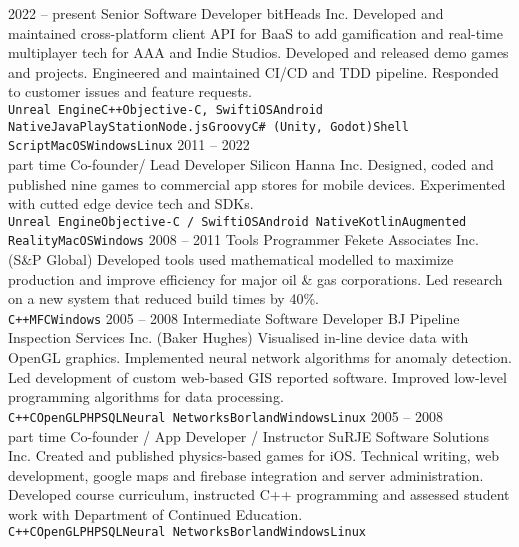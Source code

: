 \documentclass[9pt]{developercv} %
\begin{document}
\begin{entrylist}
	\entry
		{2022 -- present}
		{Senior Software Developer}
		{bitHeads Inc.}
		{Developed and maintained cross-platform client API for BaaS to add gamification and real-time multiplayer tech for AAA and Indie Studios. Developed and released demo games and projects. Engineered and maintained CI/CD and TDD pipeline. Responded to customer issues and feature requests.\\ \texttt{Unreal Engine}\slashsep\texttt{C++}\slashsep\texttt{Objective-C, Swift}\slashsep\texttt{iOS}\slashsep\texttt{Android Native}\slashsep\texttt{Java}\slashsep\texttt{PlayStation}\slashsep\texttt{Node.js}\slashsep\texttt{Groovy}\slashsep\texttt{C\# (Unity, Godot)}\slashsep\texttt{Shell Script}\slashsep\texttt{MacOS}\slashsep\texttt{Windows}\slashsep\texttt{Linux}}
\entry
		{2011 -- 2022\\\footnotesize{part time}}
		{Co-founder/ Lead Developer}
		{Silicon Hanna Inc.}
		{Designed, coded and published nine games to commercial app stores for mobile devices. Experimented with cutted edge device tech and SDKs.\\ \texttt{Unreal Engine}\slashsep\texttt{Objective-C / Swift}\slashsep\texttt{iOS}\slashsep\texttt{Android Native}\slashsep\texttt{Kotlin}\slashsep\texttt{Augmented Reality}\slashsep\texttt{MacOS}\slashsep\texttt{Windows}}
	\entry
		{2008 -- 2011}
		{Tools Programmer}
		{Fekete Associates Inc. (S\&P Global)}
		{Developed tools used mathematical modelled to maximize production and improve efficiency for major oil \& gas corporations. Led research on a new system that reduced build times by 40\%. \\ \texttt{C++}\slashsep\texttt{MFC}\slashsep\texttt{Windows}}
	\entry
		{2005 -- 2008}
		{Intermediate Software Developer}
		{BJ Pipeline Inspection Services Inc. (Baker Hughes)}
		{Visualised in-line device data with OpenGL graphics. Implemented neural network algorithms for anomaly detection. Led development of custom web-based GIS reported software. Improved low-level programming algorithms for data processing.\\ \texttt{C++}\slashsep\texttt{C}\slashsep\texttt{OpenGL}\slashsep\texttt{PHP}\slashsep\texttt{SQL}\slashsep\texttt{Neural Networks}\slashsep\texttt{Borland}\slashsep\texttt{Windows}\slashsep\texttt{Linux}}
	\entry
		{2005 -- 2008\\\footnotesize{part time}}
		{Co-founder / App Developer / Instructor}
		{SuRJE Software Solutions Inc.}
		{Created and published physics-based games for iOS. Technical writing, web development, google maps and firebase integration and server administration. Developed course curriculum, instructed C++ programming and assessed student work with Department of Continued Education.\\ \texttt{C++}\slashsep\texttt{C}\slashsep\texttt{OpenGL}\slashsep\texttt{PHP}\slashsep\texttt{SQL}\slashsep\texttt{Neural Networks}\slashsep\texttt{Borland}\slashsep\texttt{Windows}\slashsep\texttt{Linux}}

\end{entrylist}
\end{document}
